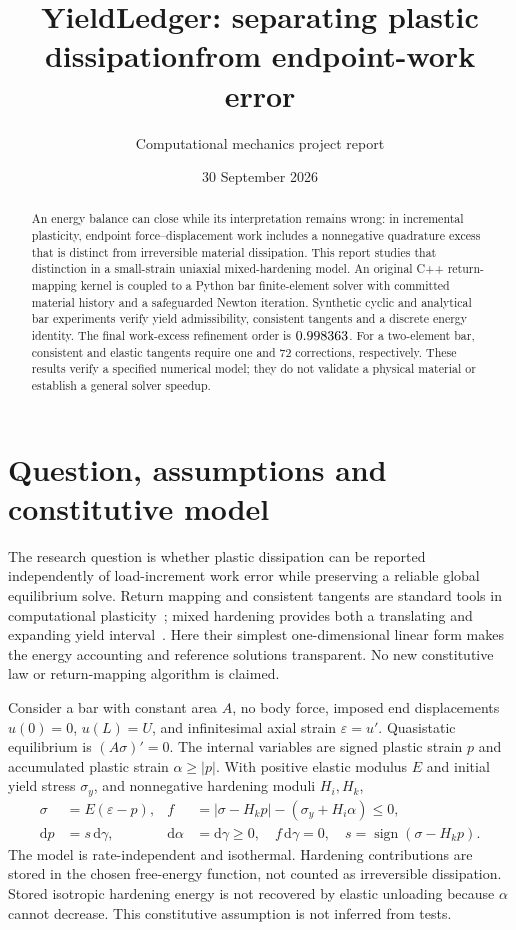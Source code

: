 \documentclass[11pt,a4paper]{article}
\title{YieldLedger: separating plastic dissipation\newline from endpoint-work error}
\author{Computational mechanics project report}
\date{30 September 2026}
\begin{document}
\maketitle
\begin{abstract}
An energy balance can close while its interpretation remains wrong: in incremental
plasticity, endpoint force--displacement work includes a nonnegative quadrature
excess that is distinct from irreversible material dissipation. This report studies
that distinction in a small-strain uniaxial mixed-hardening model. An original C++
return-mapping kernel is coupled to a Python bar finite-element solver with committed
material history and a safeguarded Newton iteration. Synthetic cyclic and analytical
bar experiments verify yield admissibility, consistent tangents and a discrete energy
identity. The final work-excess refinement order is $0.998363$. For a two-element
bar, consistent and elastic tangents require one and 72 corrections, respectively.
These results verify a specified numerical model; they do not validate a physical
material or establish a general solver speedup.
\end{abstract}

\section{Question, assumptions and constitutive model}
The research question is whether plastic dissipation can be reported independently
of load-increment work error while preserving a reliable global equilibrium solve.
Return mapping and consistent tangents are standard tools in computational
plasticity~\cite{bleyer}; mixed hardening provides both a translating and expanding
yield interval~\cite{moose}. Here their simplest one-dimensional linear form makes
the energy accounting and reference solutions transparent. No new constitutive law
or return-mapping algorithm is claimed.

Consider a bar with constant area $A$, no body force, imposed end displacements
$u(0)=0$, $u(L)=U$, and infinitesimal axial strain $\varepsilon=u'$. Quasistatic
equilibrium is $(A\sigma)'=0$. The internal variables are signed plastic strain $p$
and accumulated plastic strain $\alpha\geq |p|$. With positive elastic modulus $E$
and initial yield stress $\sigma_y$, and nonnegative hardening moduli $H_i,H_k$,
\begin{align}
 \sigma &= E(\varepsilon-p), &
 f &= |\sigma-H_kp|-(\sigma_y+H_i\alpha)\leq0,\label{eq:yield}\\
 \mathrm{d}p &= s\,\mathrm{d}\gamma, &
 \mathrm{d}\alpha &=\mathrm{d}\gamma\geq0,\quad f\,\mathrm{d}\gamma=0,
 \quad s=\operatorname{sign}(\sigma-H_kp).\label{eq:flow}
\end{align}
The model is rate-independent and isothermal. Hardening contributions are stored
in the chosen free-energy function, not counted as irreversible dissipation.
Stored isotropic hardening energy is not recovered by elastic unloading because
$\alpha$ cannot decrease. This constitutive assumption is not inferred from tests.
\end{document}
